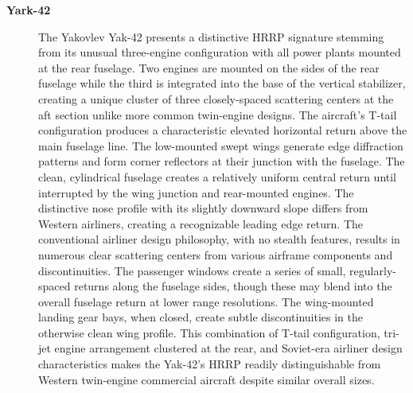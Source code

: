 {\begin{description}
    \item[\textbf{Yark-42}] %
    The Yakovlev Yak-42 presents a distinctive HRRP signature stemming from its unusual three-engine configuration with all power plants mounted at the rear fuselage. Two engines are mounted on the sides of the rear fuselage while the third is integrated into the base of the vertical stabilizer, creating a unique cluster of three closely-spaced scattering centers at the aft section unlike more common twin-engine designs. The aircraft's T-tail configuration produces a characteristic elevated horizontal return above the main fuselage line. The low-mounted swept wings generate edge diffraction patterns and form corner reflectors at their junction with the fuselage. The clean, cylindrical fuselage creates a relatively uniform central return until interrupted by the wing junction and rear-mounted engines. The distinctive nose profile with its slightly downward slope differs from Western airliners, creating a recognizable leading edge return. The conventional airliner design philosophy, with no stealth features, results in numerous clear scattering centers from various airframe components and discontinuities. The passenger windows create a series of small, regularly-spaced returns along the fuselage sides, though these may blend into the overall fuselage return at lower range resolutions. The wing-mounted landing gear bays, when closed, create subtle discontinuities in the otherwise clean wing profile. This combination of T-tail configuration, tri-jet engine arrangement clustered at the rear, and Soviet-era airliner design characteristics makes the Yak-42's HRRP readily distinguishable from Western twin-engine commercial aircraft despite similar overall sizes.


\end{description}}
